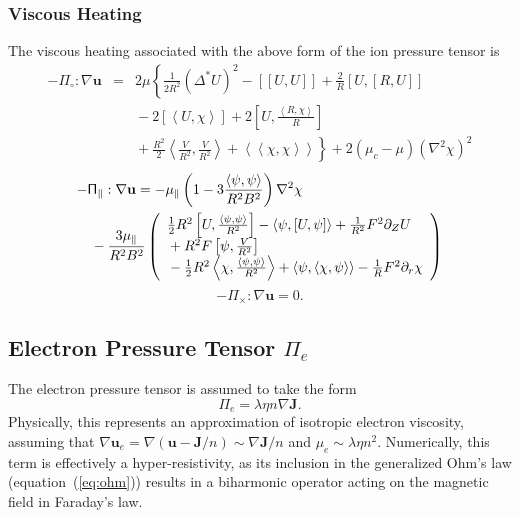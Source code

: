 \documentclass[letterpaper]{book}
\renewcommand{\vec}[1]{\ensuremath{\mathbf{#1}}}
\newcommand{\tensor}[1]{\mathsf{#1}}
\renewcommand{\u}{\vec{u}}
\renewcommand{\j}{\vec{J}}
\renewcommand{\P}{\tensor{\Pi}}
\newcommand{\grad}[1]{\nabla #1}
\newcommand{\dotdot}{:}
\newcommand{\gs}[1]{\Delta^* #1}
\newcommand{\lp}[1]{\nabla^2 #1}
\newcommand{\pb}[2]{\left[#1,#2\right]}
\newcommand{\ip}[2]{\left\langle  #1,#2\right\rangle}
\newcommand{\funcss}[2]{
  \left\langle\left\langle #1,#2 \right\rangle\right\rangle}
\newcommand{\funcsa}[2]{\left[\left\langle #1,#2 \right\rangle\right]}
\newcommand{\funcaa}[2]{\left[\left[ #1,#2 \right]\right]}
\begin{document}
\subsubsection{Viscous Heating}

The viscous heating associated with the above form of the ion pressure
tensor is
\begin{eqnarray}
  - \P_\circ \dotdot \grad{\u} & = & 2 \mu \left\{
    \frac{1}{2 R^2} (\gs{U})^2 
    - \funcaa{U}{U} + \frac{2}{R} \pb{U}{\pb{R}{U}}
    \right. \\ \nonumber & & \left. \mbox{} 
    - 2 \funcsa{U}{\chi} + 2 \pb{U}{\frac{\ip{R}{\chi}}{R}}
    \right. \\ \nonumber & & \left. \mbox{}
    + \frac{R^2}{2} \ip{\frac{V}{R^2}}{\frac{V}{R^2}}
    + \funcss{\chi}{\chi} \right\}
  + 2 (\mu_c - \mu) (\lp{\chi})^2
\end{eqnarray}
\begin{eqnarray}
  \lefteqn{-\P_\parallel \dotdot \grad{\u} = - \mu_\parallel
    \left( 1-3 \frac{\ip{\psi}{\psi}}{R^2 B^2} \right) \lp{\chi}}
  \\ && \mbox{}
    - \frac{3 \mu_\parallel}{R^2 B^2} \left( \begin{array}{l}
      \frac{1}{2} R^2 \pb{U}{\frac{\ip{\psi}{\psi}}{R^2}}
      -\ip{\psi}{\pb{U}{\psi}} + \frac{1}{R^2} F^2 \partial_Z U
       \\ \mbox{}
    + R^2 F \pb{\psi}{\frac{V}{R^2}}
       \\ \mbox{}
    - \frac{1}{2}R^2 \ip{\chi}{\frac{\ip{\psi}{\psi}}{R^2}}
    + \ip{\psi}{\ip{\chi}{\psi}} - \frac{1}{R}F^2 \partial_r \chi
    \end{array}    \right)\nonumber
\end{eqnarray}
\begin{equation}
  - \P_\times \dotdot \grad{\u} = 0.
\end{equation}


\subsection{Electron Pressure Tensor $\P_e$ 
  \label{sec:electron_pressure_tensor}}

The electron pressure tensor is assumed to take the form
\begin{equation}
  \label{eq:electron_pressure_tensor}
  \P_e = \lambda \eta n \grad{\j}.
\end{equation}
Physically, this represents an approximation of isotropic electron
viscosity, assuming that $\grad{\u_e} = \grad{(\u - \j/n)} \sim
\grad{\j}/n$ and $\mu_e \sim \lambda \eta n^2$.  Numerically, this
term is effectively a hyper-resistivity, as its inclusion in the
generalized Ohm's law (equation~(\ref{eq:ohm})) results in a
biharmonic operator acting on the magnetic field in Faraday's law.
\end{document}
